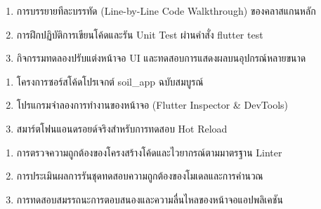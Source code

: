 \begin{tcolorbox}[
    enhanced, breakable,
    colback=white, colframe=rbruNavy,
    fonttitle=\bfseries\color{white},
    title={3. วิธีสอนและกิจกรรมการเรียนการสอน},
    arc=1.5mm, boxrule=0.8pt, leftrule=3.5mm
]
\begin{enumerate}
    \item การบรรยายทีละบรรทัด (Line-by-Line Code Walkthrough) ของคลาสแกนหลัก
    \item การฝึกปฏิบัติการเขียนโค้ดและรัน Unit Test ผ่านคำสั่ง flutter test
    \item กิจกรรมทดลองปรับแต่งหน้าจอ UI และทดสอบการแสดงผลบนอุปกรณ์หลายขนาด
\end{enumerate}
\end{tcolorbox}

\begin{tcolorbox}[
    enhanced, breakable,
    colback=white, colframe=rbruNavy,
    fonttitle=\bfseries\color{white},
    title={4. สื่อการเรียนการสอน},
    arc=1.5mm, boxrule=0.8pt, leftrule=3.5mm
]
\begin{enumerate}
    \item โครงการซอร์สโค้ดโปรเจกต์ soil\_app ฉบับสมบูรณ์
    \item โปรแกรมจำลองการทำงานของหน้าจอ (Flutter Inspector \& DevTools)
    \item สมาร์ตโฟนแอนดรอยด์จริงสำหรับการทดสอบ Hot Reload
\end{enumerate}
\end{tcolorbox}

\begin{tcolorbox}[
    enhanced, breakable,
    colback=white, colframe=rbruNavy,
    fonttitle=\bfseries\color{white},
    title={5. การวัดและประเมินผล},
    arc=1.5mm, boxrule=0.8pt, leftrule=3.5mm
]
\begin{enumerate}
    \item การตรวจความถูกต้องของโครงสร้างโค้ดและไวยากรณ์ตามมาตรฐาน Linter
    \item การประเมินผลการรันชุดทดสอบความถูกต้องของโมเดลและการคำนวณ
    \item การทดสอบสมรรถนะการตอบสนองและความลื่นไหลของหน้าจอแอปพลิเคชัน
\end{enumerate}
\end{tcolorbox}

\clearpage

